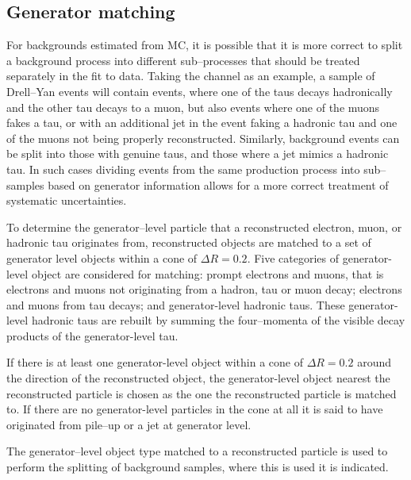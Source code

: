 \subsection{Generator matching}
\label{sec:mssm_bkgs_genmatch}
For backgrounds estimated from \ac{MC}, it is possible
that it is more correct to split a background process
into different sub--processes that should be treated separately in the fit to data.
Taking the \mutau 
channel as an example, a sample of Drell--Yan events
will contain \Ztautau events, where one of the taus decays
hadronically and the other tau decays to a muon, but also
\Zmm events where one of the muons fakes a tau, or with an 
additional jet in the event faking a hadronic tau and one of the
muons not being properly reconstructed. Similarly, \ttbar background
events can be split into those with genuine taus, and those
where a jet mimics a hadronic tau. In such cases dividing
events from the same production process into sub--samples
based on generator information allows for a more correct
treatment of systematic uncertainties.

To determine the generator--level particle
that a reconstructed electron, muon, or hadronic tau
originates from, reconstructed objects are matched
to a set of generator level objects within a cone of $\Delta R = 0.2$.
Five categories of generator-level object are considered for matching:
prompt electrons and muons,
that is electrons and muons not originating from a hadron, tau or muon decay; electrons and muons
from tau decays; and generator-level hadronic taus. These generator-level
hadronic taus are rebuilt by summing the four--momenta
of the visible decay products of the generator-level tau.

If there is at least one generator-level object
within a cone of $\Delta R = 0.2$ around the direction of the reconstructed
object, the generator-level object nearest the reconstructed particle is chosen
as the one the reconstructed particle is matched to. 
If there are no 
generator-level particles in the cone at all it is said to 
have originated from pile--up or a jet at generator level.

The generator--level object type matched to a 
reconstructed particle is used to perform the splitting
of background samples, where this is used it is indicated.

